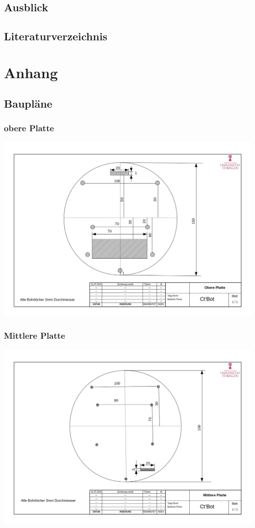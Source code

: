 \documentclass[a4paper,cleardoubleempty,BCOR1cm]{book}
\begin{document}
\section{Ausblick}




\section{Literaturverzeichnis}

%

\appendix
\chapter{Anhang}
\section{Baupläne}
\subsection{obere Platte}
\includegraphics[angle=90,origin=c, scale= 0.5]{images/Zeichnung_obere_Platte.jpg}
\subsection{Mittlere Platte}
\includegraphics[angle=90,origin=c, scale= 0.7]{images/Zeichnung_mittlere_Platte.jpg}
\end{document}
